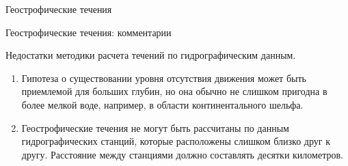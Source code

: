 \begin{chapter}{Геострофические течения}
\begin{section}{Геострофические течения: комментарии}
\begin{paragraph}{Недостатки методики расчета течений по гидрографическим данным.}
\begin{enumerate}
\item 
Гипотеза о существовании уровня отсутствия движения может быть приемлемой
для больших глубин, но она обычно не слишком пригодна в более мелкой воде,
например, в области континентального шельфа.
%

\item Геострофические течения не могут быть рассчитаны по данным 
гидрографических станций,
которые расположены слишком близко друг к другу. Расстояние между станциями
должно составлять десятки километров.
%
\end{enumerate}
\end{paragraph}



\end{section}
\end{chapter}
